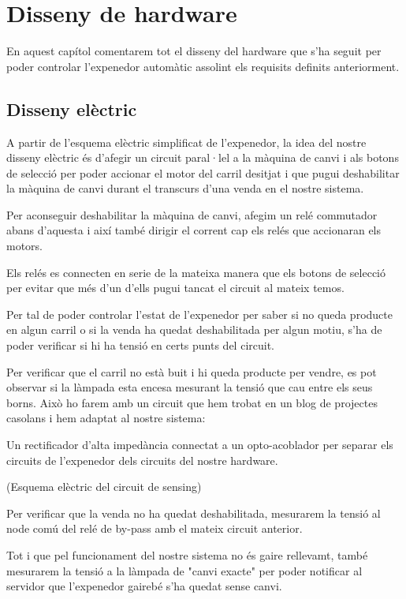 \chapter{Disseny de hardware}\label{chapter:disseny de hardware}
En aquest capítol comentarem tot el disseny del hardware que s'ha seguit per poder controlar l'expenedor automàtic assolint els requisits definits anteriorment.

\section{Disseny elèctric}
A partir de l'esquema elèctric simplificat de l'expenedor, la idea del nostre disseny elèctric és d'afegir un circuit paral·lel a la màquina de canvi i als botons de selecció per poder accionar el motor del carril desitjat i que pugui deshabilitar la màquina de canvi durant el transcurs d'una venda en el nostre sistema. 

Per aconseguir deshabilitar la màquina de canvi, afegim un relé commutador abans d'aquesta i així també dirigir el corrent cap els relés que accionaran els motors.

Els relés es connecten en serie de la mateixa manera que els botons de selecció per evitar que més d'un d'ells pugui tancat el circuit al mateix temos.

Per tal de poder controlar l'estat de l'expenedor per saber si no queda producte en algun carril o si la venda ha quedat deshabilitada per algun motiu, s'ha de poder verificar si hi ha tensió en certs punts del circuit.

Per verificar que el carril no està buit i hi queda producte per vendre, es pot observar si la làmpada esta encesa mesurant la tensió que cau entre els seus borns. Això ho farem amb un circuit que hem trobat en un blog de projectes casolans i hem adaptat al nostre sistema:

Un rectificador d'alta impedància connectat a un opto-acoblador per separar els circuits de l'expenedor dels circuits del nostre hardware.

(Esquema elèctric del circuit de sensing)

Per verificar que la venda no ha quedat deshabilitada, mesurarem la tensió al node comú del relé de by-pass amb el mateix circuit anterior.

Tot i que pel funcionament del nostre sistema no és gaire rellevamt, també mesurarem la tensió a la làmpada de "canvi exacte" per poder notificar al servidor que l'expenedor gairebé s'ha quedat sense canvi.

